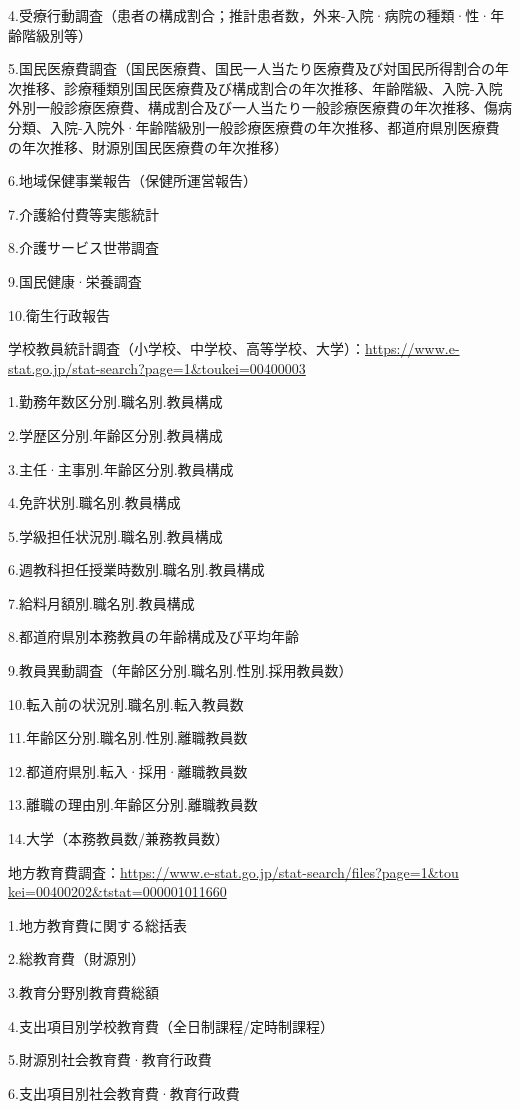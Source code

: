 4.受療行動調査（患者の構成割合；推計患者数，外来-入院·病院の種類·性·年齢階級別等）

5.国民医療費調査（国民医療費、国民一人当たり医療費及び対国民所得割合の年次推移、診療種類別国民医療費及び構成割合の年次推移、年齢階級、入院-入院外別一般診療医療費、構成割合及び一人当たり一般診療医療費の年次推移、傷病分類、入院-入院外·年齢階級別一般診療医療費の年次推移、都道府県別医療費の年次推移、財源別国民医療費の年次推移）

6.地域保健事業報告（保健所運営報告）

7.介護給付費等実態統計

8.介護サービス世帯調査

9.国民健康·栄養調査

10.衛生行政報告

学校教員統計調査（小学校、中学校、高等学校、大学）：\url{https://www.e-stat.go.jp/stat-search?page=1&toukei=00400003}

1.勤務年数区分別.職名別.教員構成

2.学歴区分別.年齢区分別.教員構成

3.主任·主事別.年齢区分別.教員構成

4.免許状別.職名別.教員構成

5.学級担任状況別.職名別.教員構成

6.週教科担任授業時数別.職名別.教員構成

7.給料月額別.職名別.教員構成

8.都道府県別本務教員の年齢構成及び平均年齢

9.教員異動調査（年齢区分別.職名別.性別.採用教員数）

10.転入前の状況別.職名別.転入教員数

11.年齢区分別.職名別.性別.離職教員数

12.都道府県別.転入·採用·離職教員数

13.離職の理由別.年齢区分別.離職教員数

14.大学（本務教員数/兼務教員数）

地方教育費調査：\url{https://www.e-stat.go.jp/stat-search/files?page=1&tou kei=00400202&tstat=000001011660}

1.地方教育費に関する総括表

2.総教育費（財源別）

3.教育分野別教育費総額

4.支出項目別学校教育費（全日制課程/定時制課程）

5.財源別社会教育費·教育行政費

6.支出項目別社会教育費·教育行政費

